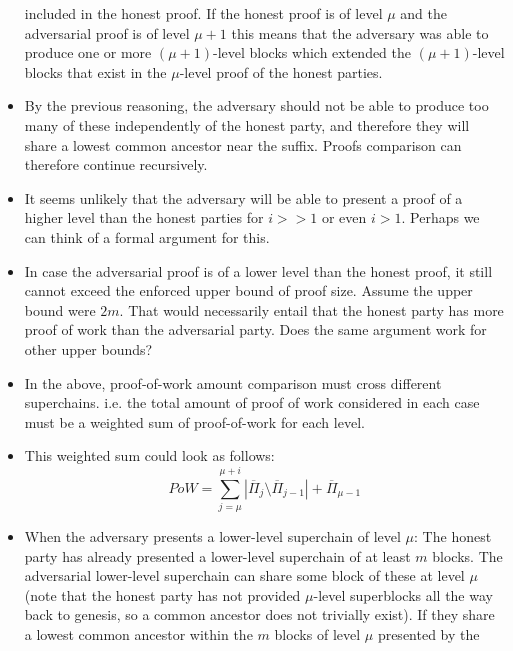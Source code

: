 \begin{itemize}
        included in the honest proof. If the honest proof is of level $\mu$ and
        the adversarial proof is of level $\mu + 1$ this means that the
        adversary was able to produce one or more $(\mu + 1)$-level blocks
        which extended the $(\mu + 1)$-level blocks that exist in the
        $\mu$-level proof of the honest parties.
    \item
        By the previous reasoning, the adversary should not be able to produce
        too many of these independently of the honest party, and therefore they
        will share a lowest common ancestor near the suffix. Proofs comparison
        can therefore continue recursively.
    \item
        It seems unlikely that the adversary will be able to present a proof of
        a higher level than the honest parties for $i >> 1$ or even $i > 1$.
        Perhaps we can think of a formal argument for this.
    \item
        In case the adversarial proof is of a lower level than the honest
        proof, it still cannot exceed the enforced upper bound of proof size.
        Assume the upper bound were $2m$. That would necessarily entail that
        the honest party has more proof of work than the adversarial party.
        Does the same argument work for other upper bounds?
    \item
        In the above, proof-of-work amount comparison must cross different
        superchains. i.e. the total amount of proof of work considered in each
        case must be a weighted sum of proof-of-work for each level.
    \item
        This weighted sum could look as follows:
        \begin{equation}
            PoW =
            \sum_{j = \mu}^{\mu + i}
            {|\overline{\Pi}_j \setminus \overline{\Pi}_{j - 1}|}
            + \overline{\Pi}_{\mu - 1}
        \end{equation}
    \item
        When the adversary presents a lower-level superchain of level $\mu$:
        The honest party has already presented a lower-level superchain of at
        least $m$ blocks. The adversarial lower-level superchain can share some
        block of these at level $\mu$ (note that the honest party has not
        provided $\mu$-level superblocks all the way back to genesis, so a
        common ancestor does not trivially exist). If they share a lowest
        common ancestor within the $m$ blocks of level $\mu$ presented by the

\end{itemize}
